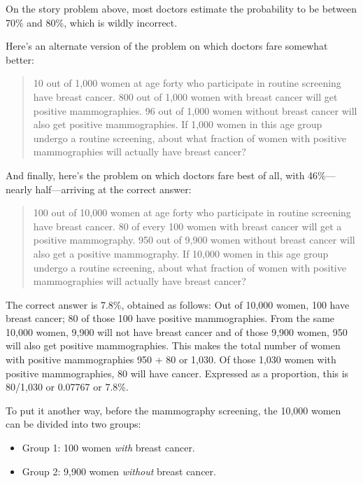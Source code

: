 {{{
 On the story problem above, most doctors estimate the probability
to be between 70\% and 80\%, which is wildly incorrect.}

{
 Here's an alternate version of the problem on
which doctors fare somewhat better:}

\begin{quote}
{
 10 out of 1,000 women at age forty who participate in routine
screening have breast cancer. 800 out of 1,000 women with breast cancer
will get positive mammographies. 96 out of 1,000 women without breast
cancer will also get positive mammographies. If 1,000 women in this age
group undergo a routine screening, about what fraction of women with
positive mammographies will actually have breast cancer?}
\end{quote}

{
 And finally, here's the problem on which doctors
fare best of all, with 46\%---nearly half---arriving at the correct
answer:}

\begin{quote}
{
 100 out of 10,000 women at age forty who participate in routine
screening have breast cancer. 80 of every 100 women with breast cancer
will get a positive mammography. 950 out of 9,900 women without breast
cancer will also get a positive mammography. If 10,000 women in this
age group undergo a routine screening, about what fraction of women
with positive mammographies will actually have breast cancer?}
\end{quote}

\hr

{
 The correct answer is 7.8\%, obtained as follows: Out of 10,000
women, 100 have breast cancer; 80 of those 100 have positive
mammographies. From the same 10,000 women, 9,900 will not have breast
cancer and of those 9,900 women, 950 will also get positive
mammographies. This makes the total number of women with positive
mammographies 950 + 80 or 1,030. Of those 1,030 women with positive
mammographies, 80 will have cancer. Expressed as a proportion, this is
80/1,030 or 0.07767 or 7.8\%.}

{
 To put it another way, before the mammography screening, the
10,000 women can be divided into two groups:}

\begin{itemize}
\item {
 Group 1: 100 women \textit{with} breast cancer.}

\item {
 Group 2: 9,900 women \textit{without} breast cancer.}
\end{itemize}

}}
